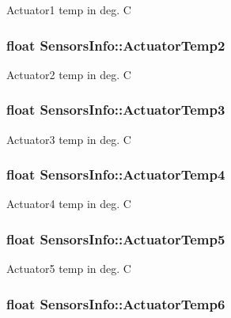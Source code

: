 Actuator1 temp in deg. C \hypertarget{struct_sensors_info_abf182850e94b2bab72a282eb2a76be75}{
\subsubsection[{Actuator\-Temp2}]{\setlength{\rightskip}{0pt plus 5cm}float Sensors\-Info\-::\-Actuator\-Temp2}}\label{struct_sensors_info_abf182850e94b2bab72a282eb2a76be75}
Actuator2 temp in deg. C \hypertarget{struct_sensors_info_aae8cdcf3e2412f99ec5cdc5a13db1528}{
\subsubsection[{Actuator\-Temp3}]{\setlength{\rightskip}{0pt plus 5cm}float Sensors\-Info\-::\-Actuator\-Temp3}}\label{struct_sensors_info_aae8cdcf3e2412f99ec5cdc5a13db1528}
Actuator3 temp in deg. C \hypertarget{struct_sensors_info_a69bb9fe27b7e18a1c09da9135a13c324}{
\subsubsection[{Actuator\-Temp4}]{\setlength{\rightskip}{0pt plus 5cm}float Sensors\-Info\-::\-Actuator\-Temp4}}\label{struct_sensors_info_a69bb9fe27b7e18a1c09da9135a13c324}
Actuator4 temp in deg. C \hypertarget{struct_sensors_info_a03c089c08df66cc62b0aa768557e2128}{
\subsubsection[{Actuator\-Temp5}]{\setlength{\rightskip}{0pt plus 5cm}float Sensors\-Info\-::\-Actuator\-Temp5}}\label{struct_sensors_info_a03c089c08df66cc62b0aa768557e2128}
Actuator5 temp in deg. C \hypertarget{struct_sensors_info_aa22bb78967dc3b480280c422613f8382}{
\subsubsection[{Actuator\-Temp6}]{\setlength{\rightskip}{0pt plus 5cm}float Sensors\-Info\-::\-Actuator\-Temp6}}\label{struct_sensors_info_aa22bb78967dc3b480280c422613f8382}
